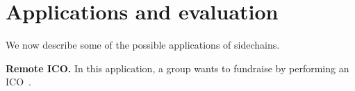\section{Applications and evaluation}

We now describe some of the possible applications of sidechains.

\noindent
\textbf{Remote ICO. } In this application, a group wants to fundraise by
performing an ICO~\cite{ico}.

